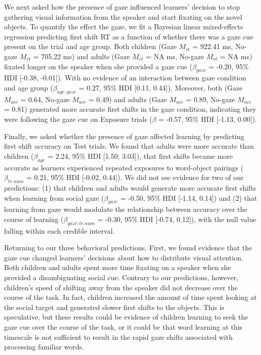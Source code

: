 \documentclass[man,floatsintext]{apa6}
\begin{document}
We next asked how the presence of gaze influenced learners' decision to
stop gathering visual information from the speaker and start fixating on
the novel objects. To quantify the effect the gaze, we fit a Bayesian
linear mixed-effects regression predicting first shift RT as a function
of whether there was a gaze cue present on the trial and age group. Both
children (Gaze \(M_{rt}\) = 922.41 ms, No-gaze \(M_{rt}\) = 705.22 ms)
and adults (Gaze \(M_{rt}\) = NA ms, No-gaze \(M_{rt}\) = NA ms) fixated
longer on the speaker when she provided a gaze cue (\(\beta_{gaze}\) =
-0.20, 95\% HDI {[}-0.38, -0.01{]}). With no evidence of an interaction
between gaze condition and age group (\(\beta_{age:gaze}\) = 0.27, 95\%
HDI {[}0.11, 0.44{]}). Moreover, both (Gaze \(M_{acc}\) = 0.64, No-gaze
\(M_{acc}\) = 0.49) and adults (Gaze \(M_{acc}\) = 0.89, No-gaze
\(M_{acc}\) = 0.81) generated more accurate first shifts in the gaze
condition, indicating they were following the gaze cue on Exposure
trials (\(\beta\) = -0.57, 95\% HDI {[}-1.13, 0.00{]}).

Finally, we asked whether the presence of gaze affected learning by
predicting first shift accuracy on Test trials. We found that adults
were more accurate than children (\(\beta_{age}\) = 2.24, 95\% HDI
{[}1.50, 3.03{]}), that first shifts became more accurate as learners
experienced repeated exposures to word-object pairings
(\(\beta_{tr.num}\) = 0.21, 95\% HDI {[}-0.02, 0.44{]}). We did not see
evidence for two of our predictions: (1) that children and adults would
generate more accurate first shifts when learning from social gaze
(\(\beta_{gaze}\) = -0.50, 95\% HDI {[}-1.14, 0.14{]}) and (2) that
learning from gaze would modulate the relationship between accuracy over
the course of learning (\(\beta_{gaze:tr.num}\) = -0.30, 95\% HDI
{[}-0.74, 0.12{]}), with the null value falling within each credible
interval.

Returning to our three behavioral predictions. First, we found evidence
that the gaze cue changed learners' decisions about how to distribute
visual attention. Both children and adults spent more time fixating on a
speaker when she provided a disambiguating social cue. Contrary to our
predictions, however, children's speed of shifting away from the speaker
did not decrease over the course of the task. In fact, children
increased the amount of time spent looking at the social target and
generated slower first shifts to the objects. This is speculative, but
these results could be evidence of children learning to seek the gaze
cue over the course of the task, or it could be that word learning at
this timescale is not sufficient to result in the rapid gaze shifts
associated with processing familiar words.
\end{document}
